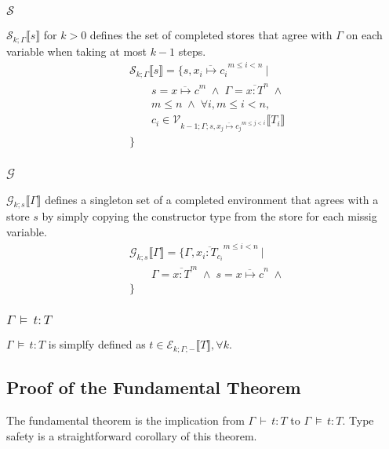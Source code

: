 \documentclass[9pt]{sigplanconf}
\newcommand{\gap}{\quad\quad}
\newcommand{\ts}{\,\vdash\,}
\newcommand{\seq}[1]{\overline{#1}}
\newcommand{\relv}[4]{\mathcal{V}_{#1;#2;#3}\llbracket#4\rrbracket}
\newcommand{\rele}[4]{\mathcal{E}_{#1;#2;#3}\llbracket#4\rrbracket}
\newcommand{\rels}[3]{\mathcal{S}_{#1;#2}\llbracket#3\rrbracket}
\newcommand{\relg}[3]{\mathcal{G}_{#1;#2}\llbracket#3\rrbracket}
\newcommand{\andl}{\;\wedge\;}
\newcommand{\ds}{\,\vDash\,}
\begin{document}
\subsubsection{$\mathcal{S}$}
$\rels k \Gamma s$ for $k > 0$ defines the set of completed stores
that agree with $\Gamma$ on each variable when taking at most $k-1$
steps.
\begin{align*}
&\rels k \Gamma s = \{ s, \seq{x_i \mapsto c_i}^{m \leq i < n} \ |\\
&\gap s = \seq{x \mapsto c}^m \andl \Gamma = \seq{x : T}^n \andl \\
&\gap m\leq n \andl \forall i, m \leq i < n,\\
&\gap c_i \in \relv {k-1} \Gamma {s, \seq{x_j \mapsto c_j}^{m \leq j < i}} {T_i}\\
&\}
\end{align*}

\subsubsection{$\mathcal{G}$}
$\relg k s \Gamma$ defines a singleton set of a completed environment
that agrees with a store $s$ by simply copying the constructor type
from the store for each missig variable.
\begin{align*}
&\relg k s \Gamma = \{ \Gamma, \seq{x_i : T_{c_i}}^{m \leq i < n} \ |\\
&\gap \Gamma = \seq{x : T}^m \andl s = \seq{x \mapsto c}^n \andl\\
&\}
\end{align*}

\subsubsection{$\Gamma \ds t : T$}

$\Gamma \ds t : T$ is simplfy defined as $t \in \rele k \Gamma - T,
\forall k$.

\subsection{Proof of the Fundamental Theorem}

The fundamental theorem is the implication from $\Gamma \ts t : T$ to
$\Gamma \ds t : T$. Type safety is a straightforward corollary of this
theorem.
\end{document}
